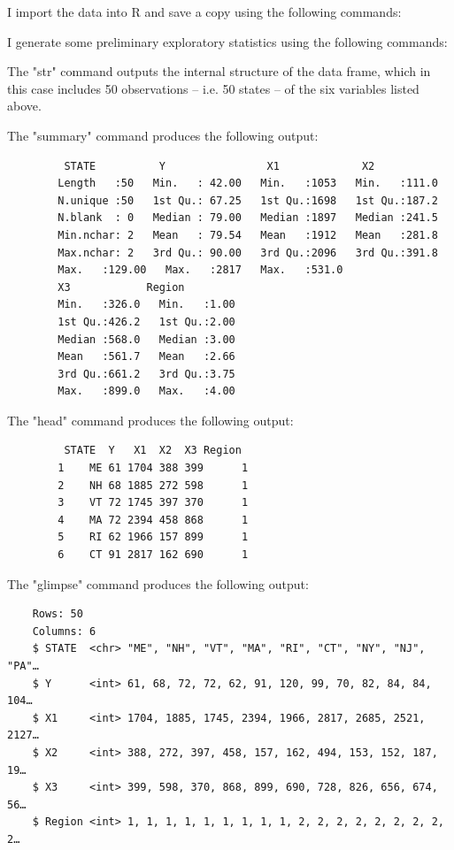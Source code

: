 \documentclass[12pt,letterpaper]{article}
\begin{document}
	I import the data into R and save a copy using the following commands:
	
	
	I generate some preliminary exploratory statistics using the following commands:
	
	
	The "str" command outputs the internal structure of the data frame, which in this case includes 50 observations -- i.e. 50 states -- of the six variables listed above. 
	
		\vspace{.5cm}
	The "summary" command produces the following output: 
	
	\begin{verbatim}
		 STATE          Y                X1             X2       
		Length   :50   Min.   : 42.00   Min.   :1053   Min.   :111.0  
		N.unique :50   1st Qu.: 67.25   1st Qu.:1698   1st Qu.:187.2  
		N.blank  : 0   Median : 79.00   Median :1897   Median :241.5  
		Min.nchar: 2   Mean   : 79.54   Mean   :1912   Mean   :281.8  
		Max.nchar: 2   3rd Qu.: 90.00   3rd Qu.:2096   3rd Qu.:391.8  
		Max.   :129.00   Max.   :2817   Max.   :531.0  
		X3            Region    
		Min.   :326.0   Min.   :1.00  
		1st Qu.:426.2   1st Qu.:2.00  
		Median :568.0   Median :3.00  
		Mean   :561.7   Mean   :2.66  
		3rd Qu.:661.2   3rd Qu.:3.75  
		Max.   :899.0   Max.   :4.00  
	\end{verbatim}
	
		\vspace{.5cm}
	
	The "head" command produces the following output:
	
	\begin{verbatim}
		 STATE  Y   X1  X2  X3 Region
		1    ME 61 1704 388 399      1
		2    NH 68 1885 272 598      1
		3    VT 72 1745 397 370      1
		4    MA 72 2394 458 868      1
		5    RI 62 1966 157 899      1
		6    CT 91 2817 162 690      1
	\end{verbatim}
	
	\vspace{.5cm}

	The "glimpse" command produces the following output:
	
\begin{verbatim}
	Rows: 50
	Columns: 6
	$ STATE  <chr> "ME", "NH", "VT", "MA", "RI", "CT", "NY", "NJ", "PA"…
	$ Y      <int> 61, 68, 72, 72, 62, 91, 120, 99, 70, 82, 84, 84, 104…
	$ X1     <int> 1704, 1885, 1745, 2394, 1966, 2817, 2685, 2521, 2127…
	$ X2     <int> 388, 272, 397, 458, 157, 162, 494, 153, 152, 187, 19…
	$ X3     <int> 399, 598, 370, 868, 899, 690, 728, 826, 656, 674, 56…
	$ Region <int> 1, 1, 1, 1, 1, 1, 1, 1, 1, 2, 2, 2, 2, 2, 2, 2, 2, 2…
\end{verbatim}
	
\end{document}
